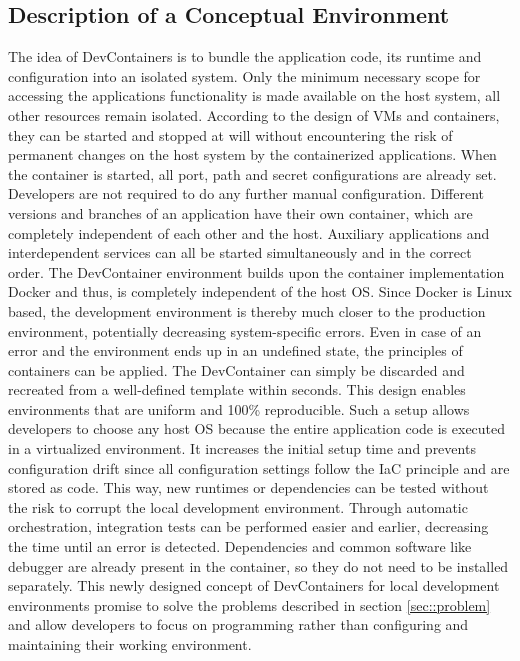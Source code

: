     \subsection{Description of a Conceptual Environment}
    The idea of DevContainers is to bundle the application code, its runtime and configuration into an isolated system. Only the minimum necessary scope for accessing the applications functionality is made available on the host system, all other resources remain isolated. According to the design of \ac{VM}s and containers, they can be started and stopped at will without encountering the risk of permanent changes on the host system by the containerized applications. When the container is started, all port, path and secret configurations are already set. Developers are not required to do any further manual configuration. Different versions and branches of an application have their own container, which are completely independent of each other and the host. Auxiliary applications and interdependent services can all be started simultaneously and in the correct order. The DevContainer environment builds upon the container implementation Docker and thus, is completely independent of the host \ac{OS}. Since Docker is Linux based, the development environment is thereby much closer to the production environment, potentially decreasing system-specific errors. Even in case of an error and the environment ends up in an undefined state, the principles of containers can be applied. The DevContainer can simply be discarded and recreated from a well-defined template within seconds. This design enables environments that are uniform and 100\% reproducible.\newline
    Such a setup allows developers to choose any host \acl{OS} because the entire application code is executed in a virtualized environment. It increases the initial setup time and prevents configuration drift since all configuration settings follow the \ac{IaC} principle and are stored as code. This way, new runtimes or dependencies can be tested without the risk to corrupt the local development environment. Through automatic orchestration, integration tests can be performed easier and earlier, decreasing the time until an error is detected. Dependencies and common software like debugger are already present in the container, so they do not need to be installed separately. This newly designed concept of DevContainers for local development environments promise to solve the problems described in section \ref{sec::problem} and allow developers to focus on programming rather than configuring and maintaining their working environment.

